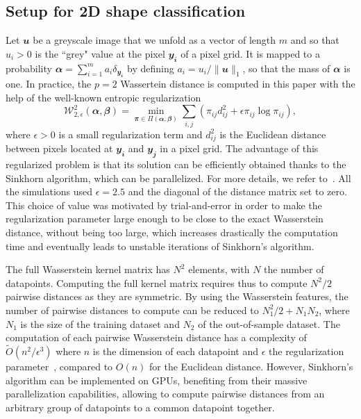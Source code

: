 \subsection{Setup for 2D shape classification} 
Let $\mathbfit{u}$ be a greyscale image that we unfold as a vector of length $m$ and so that $u_i>0$ is the ``grey" value at the pixel $\mathbfit{y_i}$ of a pixel grid. It is mapped to a probability $\mathbfit{\alpha} = \sum_{i=1}^m a_i \delta_{\mathbfit{y_i}}$ by defining $a_i = u_i/\|\mathbfit{u}\|_1$, so that the mass of $\mathbfit{\alpha}$ is one.
In practice, the $p=2$ Wassertein distance is computed in this paper with the help of the well-known entropic regularization
\begin{equation*}
\mathcal{W}_{2,\epsilon}^{2}(\mathbfit{\alpha},\mathbfit{\beta}) = \min_{\mathbfit{\pi} \in \Pi\left(\mathbfit{\alpha},\mathbfit{\beta}\right)} \sum_{i,j}\left( \pi_{ij}d_{ij}^2 +\epsilon \pi_{ij}\log  \pi_{ij} \right),
\end{equation*}
where $\epsilon>0$ is a small regularization term and $d_{ij}^2$ is the Euclidean distance between pixels located at $\mathbfit{y_i}$ and $\mathbfit{y_j}$ in a pixel grid. The advantage of this regularized problem is that its solution can be efficiently obtained thanks to the Sinkhorn algorithm, which can be parallelized. For more details, we refer to~\cite{GabrielPeyre2019COTW}. All the simulations used $\epsilon
= 2.5$ and the diagonal of the distance matrix set to zero. This choice of value was motivated by trial-and-error in order to make the regularization parameter large enough to be close to the exact Wasserstein distance, without being too large, which increases drastically the computation time and eventually leads to unstable iterations of Sinkhorn's algorithm.

The full Wasserstein kernel matrix has $N^2$ elements, with $N$ the number of datapoints. Computing the full kernel matrix requires thus to compute $N^2/2$ pairwise distances as they are symmetric. By using the Wasserstein features, the number of pairwise distances to compute can be reduced to $N_1^2/2+N_1N_2$, where $N_1$ is the size of the training dataset and $N_2$ of the out-of-sample dataset. The computation of each pairwise Wasserstein distance has a complexity of $\widetilde O\left(n^2/\epsilon^3\right)$ where $n$ is the dimension of each datapoint and $\epsilon$ the regularization parameter~\cite{Altschuler2017}, compared to $O\left(n \right)$ for the Euclidean distance. However, Sinkhorn's algorithm can be implemented on GPUs, benefiting from their massive parallelization capabilities, allowing to compute pairwise distances from an arbitrary group of datapoints to a common datapoint together. 

